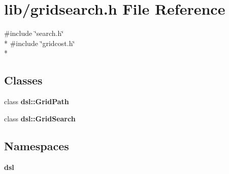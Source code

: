 \section{lib/gridsearch.h File Reference}
\label{lib_2gridsearch_8h}
{\ttfamily \#include \char`\"{}search.\-h\char`\"{}}\\*
{\ttfamily \#include \char`\"{}gridcost.\-h\char`\"{}}\\*
\subsection*{Classes}
\begin{DoxyCompactItemize}
\item 
class {\bf dsl\-::\-Grid\-Path}
\item 
class {\bf dsl\-::\-Grid\-Search}
\end{DoxyCompactItemize}
\subsection*{Namespaces}
\begin{DoxyCompactItemize}
\item 
{\bf dsl}
\end{DoxyCompactItemize}
